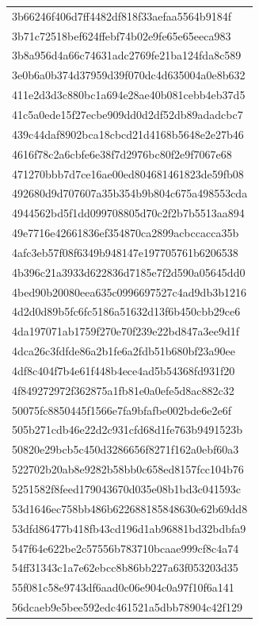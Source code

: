 \begin{tabular}{l}
3b66246f406d7ff4482df818f33aefaa5564b9184f \\
3b71c72518bef624ffebf74b02e9fe65e65eeca983 \\
3b8a956d4a66c74631adc2769fe21ba124fda8c589 \\
3e0b6a0b374d37959d39f070dc4d635004a0e8b632 \\
411e2d3d3c880bc1a694e28ae40b081cebb4eb37d5 \\
41c5a0ede15f27ecbe909dd0d2df52db89adadcbc7 \\
439c44daf8902bca18cbcd21d4168b5648e2e27b46 \\
4616f78c2a6cbfe6e38f7d2976bc80f2e9f7067e68 \\
471270bbb7d7ce16ae00ed804681461823de59fb08 \\
492680d9d707607a35b354b9b804c675a498553cda \\
4944562bd5f1dd099708805d70c2f2b7b5513aa894 \\
49e7716e42661836ef354870ca2899acbccacca35b \\
4afc3eb57f08f6349b948147e197705761b6206538 \\
4b396c21a3933d622836d7185e7f2d590a05645dd0 \\
4bed90b20080eea635c0996697527c4ad9db3b1216 \\
4d2d0d89b5fc6fc5186a51632d13f6b450cbb29ce6 \\
4da197071ab1759f270e70f239e22bd847a3ee9d1f \\
4dca26c3fdfde86a2b1fe6a2fdb51b680bf23a90ee \\
4df8c404f7b4e61f448b4ece4ad5b54368fd931f20 \\
4f849272972f362875a1fb81e0a0efe5d8ac882c32 \\
50075fc8850445f1566e7fa9bfafbe002bde6e2e6f \\
505b271cdb46e22d2c931cfd68d1fe763b9491523b \\
50820e29bcb5c450d3286656f8271f162a0ebf60a3 \\
522702b20ab8e9282b58bb0c658ed8157fcc104b76 \\
5251582f8feed179043670d035e08b1bd3c041593c \\
53d1646ec758bb486b622688185848630e62b69dd8 \\
53dfd86477b418fb43cd196d1ab96881bd32bdbfa9 \\
547f64e622be2c57556b783710bcaae999cf8c4a74 \\
54ff31343c1a7e62ebcc8b86bb227a63f053203d35 \\
55f081c58e9743df6aad0c06e904c0a97f10f6a141 \\
56dcaeb9e5bee592edc461521a5dbb78904c42f129 \\

\end{tabular}
